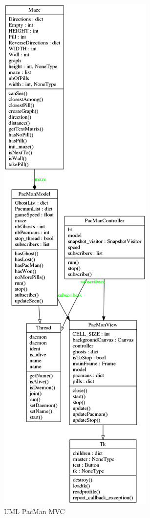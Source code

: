 \documentclass[11pt]{article}
\begin{document}
\begin{figure}[htb]
\centering
\includegraphics[width=.4\textwidth]{./img/Pacman_vf.png}
\caption{\label{pacman_vf}UML PacMan MVC}
\end{figure}
\end{document}

